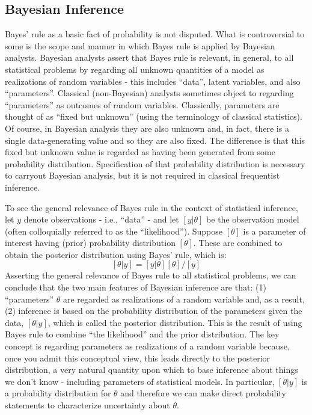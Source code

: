 \subsection{Bayesian Inference}

Bayes' rule as a basic fact of probability is not disputed.
What is controversial to some is the scope and manner in which Bayes
rule is applied by Bayesian analysts. Bayesian analysts assert that
Bayes rule is relevant, in general, to all statistical problems by
regarding all unknown quantities of a model as realizations of random
variables - this includes ``data'', latent variables, and also
``parameters''. Classical (non-Bayesian) analysts sometimes object to
regarding ``parameters'' as outcomes of random variables. Classically,
parameters are thought of as ``fixed but unknown'' (using the
terminology of classical statistics). Of course, in Bayesian analysis
they are also unknown and, in fact, there is a single data-generating
value and so they are also fixed. The difference is that this fixed
but unknown value is regarded as having been generated from some
probability distribution. Specification of that probability
distribution is necessary to carryout Bayesian analysis, but it is not
required in classical frequentist inference.


To see the general relevance of Bayes rule in the context of
statistical inference, let $y$ denote observations - i.e., ``data'' -
and let $[y|\theta]$ be the observation model (often colloquially
referred to as the ``likelihood'').  Suppose $[\theta]$ is a parameter of
interest having (prior) probability distribution $[\theta]$. These are
combined to obtain the posterior distribution using Bayes' rule, which
is:
\[
 [\theta|y]= [y|\theta][\theta]/[y]
\]
Asserting the general relevance of Bayes rule to all statistical
problems, we can conclude that the two main features of Bayesian
inference are that: (1) ``parameters'' $\theta$ are regarded as realizations of
a random variable and, as a result, (2) inference is based on the
probability distribution of the parameters given the data,
$[\theta|y]$,
which is
called the posterior distribution. This is the result of using Bayes
rule to combine ``the likelihood'' and the prior distribution.  The
key concept is regarding parameters as realizations of a random
variable because, once you admit this conceptual view, this leads
directly to the posterior distribution, a very natural quantity upon
which to base inference about things we don't know -  including
parameters of statistical models.  In particular, $[\theta|y]$ is a
probability distribution for $\theta$ and therefore we can make direct
probability statements to characterize uncertainty about
$\theta$.

